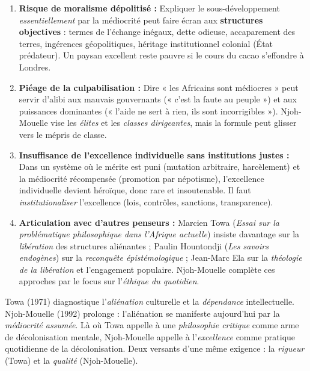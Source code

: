 \documentclass[11pt]{article}
\begin{document}
\begin{propriete}
\begin{enumerate}
\item \textbf{Risque de moralisme dépolitisé :} Expliquer le sous-développement \emph{essentiellement} par la médiocrité peut faire écran aux \textbf{structures objectives} : termes de l'échange inégaux, dette odieuse, accaparement des terres, ingérences géopolitiques, héritage institutionnel colonial (État prédateur). Un paysan excellent reste pauvre si le cours du cacao s'effondre à Londres.
\item \textbf{Piéage de la culpabilisation :} Dire « les Africains sont médiocres » peut servir d'alibi aux mauvais gouvernants (« c'est la faute au peuple ») et aux puissances dominantes (« l'aide ne sert à rien, ils sont incorrigibles »). Njoh-Mouelle vise les \emph{élites} et les \emph{classes dirigeantes}, mais la formule peut glisser vers le mépris de classe.
\item \textbf{Insuffisance de l'excellence individuelle sans institutions justes :} Dans un système où le mérite est puni (mutation arbitraire, harcèlement) et la médiocrité récompensée (promotion par népotisme), l'excellence individuelle devient héroïque, donc rare et insoutenable. Il faut \emph{institutionaliser} l'excellence (lois, contrôles, sanctions, transparence).
\item \textbf{Articulation avec d'autres penseurs :} Marcien Towa (\emph{Essai sur la problématique philosophique dans l'Afrique actuelle}) insiste davantage sur la \emph{libération} des structures aliénantes ; Paulin Hountondji (\emph{Les savoirs endogènes}) sur la \emph{reconquête épistémologique} ; Jean-Marc Ela sur la \emph{théologie de la libération} et l'engagement populaire. Njoh-Mouelle complète ces approches par le focus sur l'\emph{éthique du quotidien}.
\end{enumerate}
\end{propriete}

\begin{experience}
Towa (1971) diagnostique l'\emph{aliénation} culturelle et la \emph{dépendance} intellectuelle. Njoh-Mouelle (1992) prolonge : l'aliénation se manifeste aujourd'hui par la \emph{médiocrité assumée}. Là où Towa appelle à une \emph{philosophie critique} comme arme de décolonisation mentale, Njoh-Mouelle appelle à l'\emph{excellence} comme pratique quotidienne de la décolonisation. Deux versants d'une même exigence : la \emph{rigueur} (Towa) et la \emph{qualité} (Njoh-Mouelle).
\end{experience}
\end{document}
